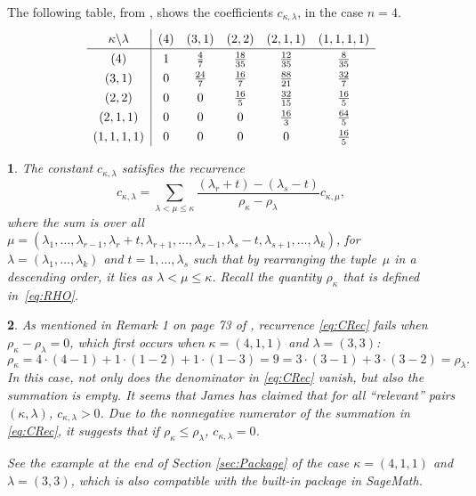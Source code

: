 \documentclass[smallextended]{svjour3}
\newtheorem{thm}{\protect\theoremname}
\newtheorem{rem}[thm]{\protect\remarkname}
\providecommand{\remarkname}{Remark}
\providecommand{\theoremname}{Theorem}
\begin{document}
\begin{example}\label{Tables}
The following table, from \cite[p.~238]{Muirhead}, shows
the coefficients $c_{\kappa,\lambda}$, in the case $n=4$.
\[
\def\arraystretch{1.3}
\begin{array}{c@{\;\;}|@{\;\;}c@{\quad}c@{\quad}c@{\quad}c@{\quad}c}
\kappa\backslash\lambda & \left(4\right) & \left(3,1\right) & \left(2,2\right) & \left(2,1,1\right) & \left(1,1,1,1\right)\\ \hline
\left(4\right) & 1 & \frac{4}{7} & \frac{18}{35} & \frac{12}{35} & \frac{8}{35}\\
\left(3,1\right) & 0 & \frac{24}{7} & \frac{16}{7} & \frac{88}{21} & \frac{32}{7}\\
\left(2,2\right) & 0 & 0 & \frac{16}{5} & \frac{32}{15} & \frac{16}{5}\\
\left(2,1,1\right) & 0 & 0 & 0 & \frac{16}{3} & \frac{64}{5}\\
\left(1,1,1,1\right) & 0 & 0 & 0 & 0 & \frac{16}{5}
\end{array}
\]
\end{example}
\begin{thm}
The constant $c_{\kappa,\lambda}$ satisfies the recurrence \cite[eq.~14]{Muirhead}
\begin{equation}\label{eq:CRec}
  c_{\kappa,\lambda} =
  \sum_{\lambda<\mu\leq\kappa}\frac{\left(\lambda_{r}+t\right)-\left(\lambda_{s}-t\right)}{\rho_{\kappa}-\rho_{\lambda}}c_{\kappa,\mu},
\end{equation}
where the sum is over all $ \mu=(\lambda_1,\ldots,\lambda_{r-1},\lambda_r+t,\lambda_{r+1},\ldots,
  \lambda_{s-1},\lambda_s-t,\lambda_{s+1}, \allowbreak \ldots,\lambda_k)$, for $\lambda=\left(\lambda_1,\ldots,\lambda_k\right)$
and $t=1,\ldots,\lambda_s$ such that by rearranging the tuple~$\mu$
in a descending order, it lies as $\lambda<\mu\leq\kappa$. Recall the quantity
$\rho_\kappa$ that is defined in~\eqref{eq:RHO}.
\end{thm}

\begin{rem}
As mentioned in Remark 1 on page 73 of  \cite{Takemura}, recurrence \eqref{eq:CRec} fails when $\rho_\kappa-\rho_\lambda=0$, which first occurs when $\kappa=(4,1,1)$ and $\lambda=(3,3)$: 
\[
\rho_\kappa=4\cdot(4-1)+1\cdot(1-2)+1\cdot(1-3)=9=3\cdot(3-1)+3\cdot(3-2)=\rho_\lambda.
\]
In this case, not only does the denominator in \eqref{eq:CRec} vanish, but also the summation is empty. 
It seems that James \cite{James1} has claimed that for all ``relevant'' pairs $(\kappa,\lambda)$, $c_{\kappa,\lambda}>0$. Due to the nonnegative numerator of the summation in \eqref{eq:CRec}, it suggests that if $\rho_\kappa\leq\rho_\lambda$,  $c_{\kappa,\lambda}=0$. 

See the example at the end of Section \ref{sec:Package} of the case $\kappa=(4,1,1)$ and $\lambda=(3,3)$, which is also compatible with the built-in package in SageMath.
\end{rem}
\end{document}
